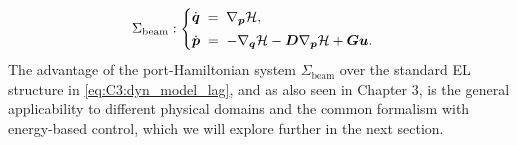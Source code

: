 \begin{align}
\Sigma_{\textrm{beam}}: 
\begin{cases}
\dot{\boldsymbol{q}} \;=\; \nabla_{\boldsymbol{p}} \mathcal{H}, \\[0.25em]
\dot{\boldsymbol{p}} \;=\; -\nabla_{\boldsymbol{q}} \mathcal{H} - \boldsymbol{D}\nabla_{\boldsymbol{p}} \mathcal{H} + \boldsymbol{Gu}.
\end{cases}
\label{eq:C3:model_ph}
\end{align}
%
The advantage of the port-Hamiltonian system $\Sigma_\textrm{beam}$ over the standard EL structure in \eqref{eq:C3:dyn_model_lag}, and as also seen in Chapter 3, is the general applicability to different physical domains and the common formalism with energy-based control, which we will explore further in the next section. %
